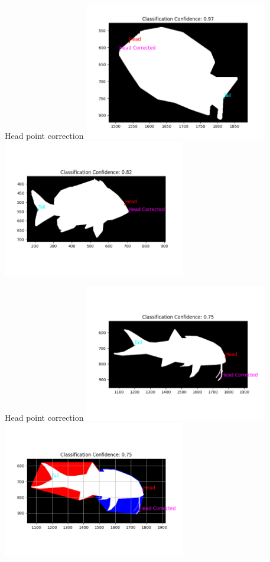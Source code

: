 \begin{frame}{Head point correction}
    \centering
    \includegraphics[height=0.6\textheight,width=0.6\textwidth,keepaspectratio]{images/fs_head_correction1.png}
    \includegraphics[height=0.6\textheight,width=0.6\textwidth,keepaspectratio]{images/fs_head_correction3.png}
\end{frame}

\begin{frame}{Head point correction}
    \centering
    \includegraphics[height=0.6\textheight,width=0.6\textwidth,keepaspectratio]{images/fs_head_correction5.png}
    \includegraphics[height=0.6\textheight,width=0.6\textwidth,keepaspectratio]{images/fs_head_correction6.png}
\end{frame}


